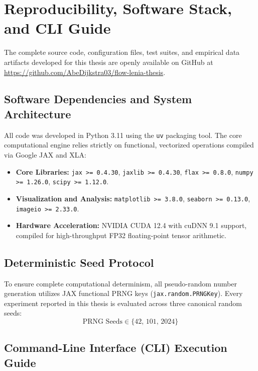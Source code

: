 \section{Reproducibility, Software Stack, and CLI Guide}
\label{sec:appendix_reproducibility}

The complete source code, configuration files, test suites, and empirical data artifacts developed for this thesis are openly available on GitHub at \url{https://github.com/AbeDijkstra03/flow-lenia-thesis}.

\subsection{Software Dependencies and System Architecture}
\label{subsec:app_software_stack}

All code was developed in Python 3.11 using the \texttt{uv} packaging tool. The core computational engine relies strictly on functional, vectorized operations compiled via Google JAX and XLA:

\begin{itemize}
    \item \textbf{Core Libraries:} \texttt{jax >= 0.4.30}, \texttt{jaxlib >= 0.4.30}, \texttt{flax >= 0.8.0}, \texttt{numpy >= 1.26.0}, \texttt{scipy >= 1.12.0}.
    \item \textbf{Visualization and Analysis:} \texttt{matplotlib >= 3.8.0}, \texttt{seaborn >= 0.13.0}, \texttt{imageio >= 2.33.0}.
    \item \textbf{Hardware Acceleration:} NVIDIA CUDA 12.4 with cuDNN 9.1 support, compiled for high-throughput FP32 floating-point tensor arithmetic.
\end{itemize}

\subsection{Deterministic Seed Protocol}
\label{subsec:app_seed_protocol}

To ensure complete computational determinism, all pseudo-random number generation utilizes JAX functional PRNG keys (\texttt{jax.random.PRNGKey}). Every experiment reported in this thesis is evaluated across three canonical random seeds:
\begin{equation}
\text{PRNG Seeds} \in \{42, \, 101, \, 2024\}
\label{eq:app_seeds}
\end{equation}

\subsection{Command-Line Interface (CLI) Execution Guide}
\label{subsec:app_cli_guide}

